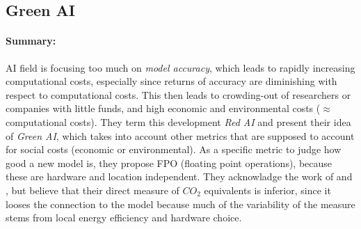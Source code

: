 \documentclass[a4paper, 12pt]{article}
\begin{document}
\subsection{Green AI}
\centerline{}
\vspace{1em}

\paragraph{Summary:} AI field is focusing too much on \emph{model accuracy}, which leads
to rapidly increasing computational costs, especially since returns of accuracy are
diminishing with respect to computational costs. This then leads to crowding-out of
researchers or companies with little funds, and high economic and environmental costs
($\approx$ computational costs). They term this development \emph{Red AI} and present
their idea of \emph{Green AI}, which takes into account other metrics that are supposed
to account for social costs (economic or environmental). As a specific metric to judge
how good a new model is, they propose FPO (floating point operations), because these are
hardware and location independent. They acknowladge the work of 
and , but believe that their direct measure of $CO_2$ equivalents
is inferior, since it looses the connection to the model because much of the variability
of the measure stems from local energy efficiency and hardware choice.


\nocite{*}
\printbibliography[heading=bibintoc, title={Bibliography}]
\end{document}
